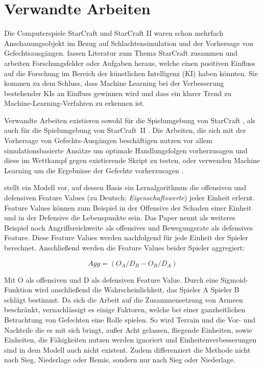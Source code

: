 \section{Verwandte Arbeiten}
\label{VerwandteArbeiten}

Die Computerspiele StarCraft und StarCraft II waren schon mehrfach Anschauungsobjekt im Bezug auf Schlachtensimulation und der Vorhersage von Gefechtsausgängen. \textcite{AAAI:aimag/Robertson14} fassen Literatur zum Thema StarCraft zusammen und arbeiten Forschungsfelder oder Aufgaben heraus, welche einen positiven Einfluss auf die Forschung im Bereich der künstlichen Intelligenz (KI) haben könnten. Sie kommen zu dem Schluss, dass Machine Learning bei der Verbesserung bestehender KIs an Einfluss gewinnen wird und dass ein klarer Trend zu Machine-Learning-Verfahren zu erkennen ist. 

Verwandte Arbeiten existieren sowohl für die Spielumgebung von StarCraft \parencite{AIIDE137381, DBLP:conf/aiide/ChurchillSB12, AIIDE1511531, SnchezRuizGranados2015PredictingTO, 6633643, 6374183}, als auch für die Spielumgebung von StarCraft~II \parencite{DBLP:journals/corr/HelmkeKW14, samvelyan2019starcraft}. Die Arbeiten, die sich mit der Vorhersage von Gefechts-Ausgängen beschäftigen nutzen vor allem simulationsbasierte Ansätze  \parencite{6633643, DBLP:conf/aiide/ChurchillSB12, DBLP:journals/corr/HelmkeKW14} um optimale Handlungsfolgen vorherzusagen und diese im Wettkampf gegen existierende Skript zu testen, oder verwenden Machine Learning um die Ergebnisse der Gefechte vorherzusagen \parencite{SnchezRuizGranados2015PredictingTO, AIIDE137381, AIIDE1511531}.


\textcite{AIIDE137381} stellt ein Modell vor, auf dessen Basis ein Lernalgorithmus die offensiven und defensiven Feature Values (zu Deutsch: \textit{Eigenschaftswerte}) jeder Einheit erlernt. Feature Values können zum Beispiel in der Offensive der Schaden einer Einheit und in der Defensive die Lebenspunkte sein. Das Paper nennt als weiteres Beispiel noch Angriffsreichweite als offensives und Bewegungsrate als defensives Feature. Diese Feature Values werden nachfolgend für jede Einheit der Spieler berechnet. Anschließend werden die Feature Values beider Spieler aggregiert:

\begin{equation}
Agg = (O_A / D_B - O_B / D_A)
\end{equation}

Mit O als offensiven und D als defensiven Feature Value. Durch eine Sigmoid-Funktion wird anschließend die Wahrscheinlichkeit, das Spieler A Spieler B schlägt bestimmt. Da sich die Arbeit auf die Zusammensetzung von Armeen beschränkt, vernachlässigt es einige Faktoren, welche bei einer ganzheitlichen Betrachtung von Gefechten eine Rolle spielen. So wird Terrain und die Vor- und Nachteile die es mit sich bringt, außer Acht gelassen, fliegende Einheiten, sowie Einheiten, die Fähigkeiten nutzen werden ignoriert und Einheitenverbesserungen sind in dem Modell auch nicht existent. Zudem differenziert die Methode nicht nach Sieg, Niederlage oder Remis, sondern nur nach Sieg oder Niederlage.

